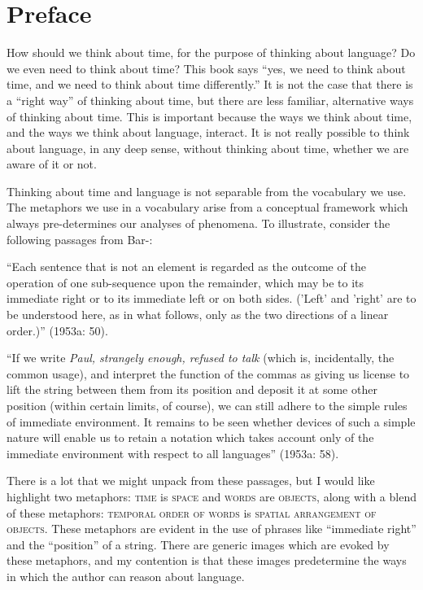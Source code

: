 
\chapter{Preface}

How should we think about time, for the purpose of thinking about language? Do we even need to think about time? This book says “yes, we need to think about time, and we need to think about time differently.” It is not the case that there is a “right way” of thinking about time, but there are less familiar, alternative ways of thinking about time. This is important because the ways we think about time, and the ways we think about language, interact. It is not really possible to think about language, in any deep sense, without thinking about time, whether we are aware of it or not. 

  Thinking about time and language is not separable from the vocabulary we use. The metaphors we use in a vocabulary arise from a conceptual framework which always pre-determines our analyses of phenomena. To illustrate, consider the following passages from Bar-\citet{Hillel1953a}:

“Each sentence that is not an element is regarded as the outcome of the operation of one sub-sequence upon the remainder, which may be to its immediate right or to its immediate left or on both sides. ('Left' and 'right' are to be understood here, as in what follows, only as the two directions of a linear order.)” (1953a: 50).

“If we write \textit{Paul, strangely enough, refused to talk} (which is, incidentally, the common usage), and interpret the function of the commas as giving us license to lift the string between them from its position and deposit it at some other position (within certain limits, of course), we can still adhere to the simple rules of immediate environment. It remains to be seen whether devices of such a simple nature will enable us to retain a notation which takes account only of the immediate environment with respect to all languages” (1953a: 58).

There is a lot that we might unpack from these passages, but I would like highlight two metaphors: \textsc{time} is \textsc{space} and \textsc{words} are \textsc{objects}, along with a blend of these metaphors: \textsc{temporal order of words} is \textsc{spatial arrangement of objects}. These metaphors are evident in the use of phrases like “immediate right” and the “position” of a string. There are generic images which are evoked by these metaphors, and my contention is that these images predetermine the ways in which the author can reason about language. 

